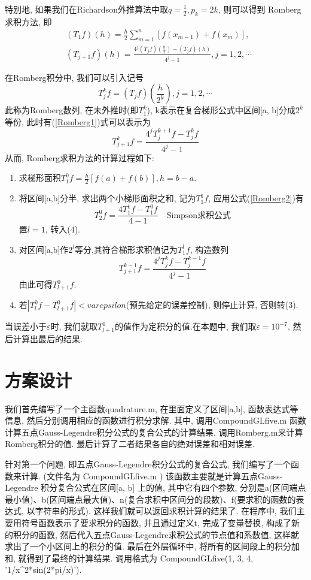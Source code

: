 \documentclass[a4paper]{article}
\begin{document}
\begin{spacing}{1.5}
\begin{CJK*}{GBK}{song}
特别地, 如果我们在Richardson外推算法中取$q=\frac{1}{2}, p_k=2k$, 则可以得到 Romberg 求积方法, 即
\begin{equation}\label{Romberg1}
 \begin{split}
 & (T_1f)(h)=\frac{h}{2}\sum_{m=1}^n[f(x_{m-1})+f(x_m)], \\
 & (T_{j+1}f)(h) = \frac{4^j(T_jf)\left(\frac{h}{2}\right) -(T_jf)(h)  }{4^j-1}, j=1, 2,\cdots
\end{split}
\end{equation}

在Romberg积分中, 我们可以引入记号
$$T_j^kf=(T_jf)\left(\frac{h}{2^k}\right),j=1,2,\cdots$$
此称为Romberg数列, 在未外推时(即$T_1^k$), k表示在复合梯形公式中区间[a, b]分成$2^k$等份, 此时有(\ref{Romberg1})式可以表示为
\begin{equation}\label{Romberg2}
T_{j+1}^kf = \frac{4^jT_j^{k+1}f-T_j^kf}{4^j-1}
\end{equation}
从而, Romberg求积方法的计算过程如下:
\begin{enumerate}[(1)]
\item 求梯形面积$T_1^0f=\frac{h}{2}[f(a)+f(b)], h=b-a.$
\item 将区间[a,b]分半, 求出两个小梯形面积之和, 记为$T_1^1f$, 应用公式(\ref{Romberg2})有
$$T_{2}^0f = \frac{4T_1^1f-T_1^0f}{4-1}\quad\text{Simpson求积公式}$$
置$l=1$, 转入(4).
\item 对区间[a,b]作$2^l$等分,其符合梯形求积值记为$T_1^lf$, 构造数列
$$T_{j+1}^{k-1}f = \frac{4^jT_j^{k}f-T_j^{k-1}f}{4^j-1}$$
由此可得$T_{l+1}^0f.$
\item 若$|T_l^0f-T^0_{l+1}f|<varepsilon$(预先给定的误差控制), 则停止计算, 否则转(3).
\end{enumerate}
当误差小于$\varepsilon$时, 我们就取$T^0_{l+1}$的值作为定积分的值.在本题中, 我们取$\varepsilon= 10^{-7}$, 然后计算出最后的结果.

\section{方案设计}
我们首先编写了一个主函数quadrature.m, 在里面定义了区间[a,b], 函数表达式等信息, 然后分别调用相应的函数进行积分求解. 其中, 调用CompoundGLfive.m 函数 计算五点Gauss-Legendre积分公式的复合公式的计算结果, 调用Romberg.m来计算Romberg积分的值. 最后计算了二者结果各自的绝对误差和相对误差.\par
针对第一个问题, 即五点Gauss-Legendre积分公式的复合公式, 我们编写了一个函数来计算. (文件名为 CompoundGLfive.m ) 该函数主要就是计算五点Gauss-Legendre 积分复合公式在区间[a, b] 上的值, 其中它有四个参数, 分别是a(区间端点最小值)、b(区间端点最大值)、n(复合求积中区间分的段数)、f(要求积的函数的表达式, 以字符串的形式). 这样我们就可以返回求积计算的结果了. 在程序中, 我们主要用符号函数表示了要求积分的函数, 并且通过定义t, 完成了变量替换, 构成了新的积分的函数, 然后代入五点Gauss-Legendre求积公式的节点值和系数值, 这样就求出了一个小区间上的积分的值. 最后在外层循环中, 将所有的区间段上的积分加和, 就得到了最终的计算结果. 调用格式为 CompoundGLfive(1, 3, 4, '1/x\^{}2*sin(2*pi/x)').\par


\end{CJK*}
\end{spacing}
\end{document}
